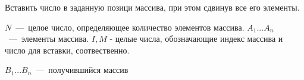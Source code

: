 Вставить число в заданную позици массива, при этом сдвинув все его элементы. 

\InputFile

$N$~---~целое число, определяющее количество элементов массива.
$A_1 ... A_n$~---~элементы массива. 
$I, M$ - целые числа, обозначающие индекс массива и число для вставки, соотвественно. 
\OutputFile

$B_1 ... B_n$~---~получившийся массив

\SAMPLES
